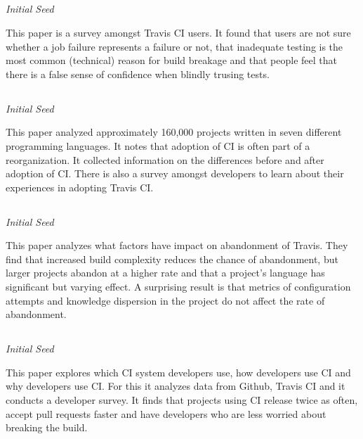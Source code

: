 \documentclass[]{book}
\begin{document}
\subsection{\texorpdfstring{\citet{pinto2018work}}{@pinto2018work}}\label{pinto2018work}

\emph{Initial Seed}

This paper is a survey amongst Travis CI users. It found that users are
not sure whether a job failure represents a failure or not, that
inadequate testing is the most common (technical) reason for build
breakage and that people feel that there is a false sense of confidence
when blindly trusing tests.

\subsection{\texorpdfstring{\citet{zhao2017impact}}{@zhao2017impact}}\label{zhao2017impact}

\emph{Initial Seed}

This paper analyzed approximately 160,000 projects written in seven
different programming languages. It notes that adoption of CI is often
part of a reorganization. It collected information on the differences
before and after adoption of CI. There is also a survey amongst
developers to learn about their experiences in adopting Travis CI.

\subsection{\texorpdfstring{\citet{widder2018m}}{@widder2018m}}\label{widder2018m}

\emph{Initial Seed}

This paper analyzes what factors have impact on abandonment of Travis.
They find that increased build complexity reduces the chance of
abandonment, but larger projects abandon at a higher rate and that a
project's language has significant but varying effect. A surprising
result is that metrics of configuration attempts and knowledge
dispersion in the project do not affect the rate of abandonment.

\subsection{\texorpdfstring{\citet{hilton2016usage}}{@hilton2016usage}}\label{hilton2016usage}

\emph{Initial Seed}

This paper explores which CI system developers use, how developers use
CI and why developers use CI. For this it analyzes data from Github,
Travis CI and it conducts a developer survey. It finds that projects
using CI release twice as often, accept pull requests faster and have
developers who are less worried about breaking the build.
\end{document}
